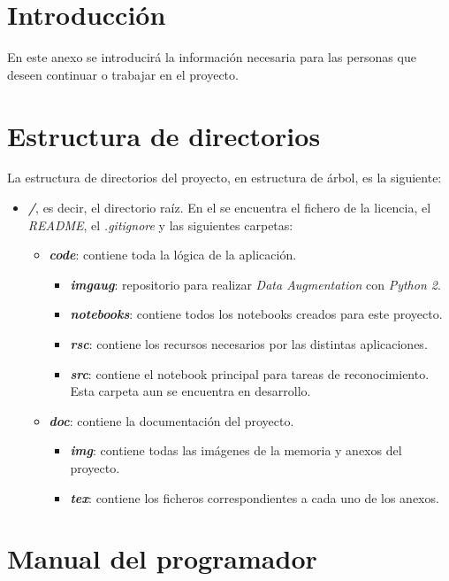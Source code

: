 
\section{Introducción}
En este anexo se introducirá la información necesaria para las personas que deseen continuar o trabajar en el proyecto.

\section{Estructura de directorios}
La estructura de directorios del proyecto, en estructura de árbol, es la siguiente:

\begin{itemize}
	\item \textit{\textbf{/}}, es decir, el directorio raíz. En el se encuentra el fichero de la licencia, el \textit{README}, el \textit{.gitignore} y las siguientes carpetas:
	\begin{itemize}
		\item \textit{\textbf{code}}: contiene toda la lógica de la aplicación.
			\begin{itemize}
				\item \textit{\textbf{imgaug}}: repositorio para realizar \textit{Data Augmentation} con \textit{Python 2}.
				\item \textit{\textbf{notebooks}}: contiene todos los notebooks creados para este proyecto.
				\item \textit{\textbf{rsc}}: contiene los recursos necesarios por las distintas aplicaciones.
				\item \textit{\textbf{src}}: contiene el notebook principal para tareas de reconocimiento. Esta carpeta aun se encuentra en desarrollo.
			\end{itemize}
		\item \textit{\textbf{doc}}: contiene la documentación del proyecto.
			\begin{itemize}
				\item \textit{\textbf{img}}: contiene todas las imágenes de la memoria y anexos del proyecto.
				\item \textit{\textbf{tex}}: contiene los ficheros correspondientes a cada uno de los anexos.
			\end{itemize}
	\end{itemize}
\end{itemize}

\section{Manual del programador}

